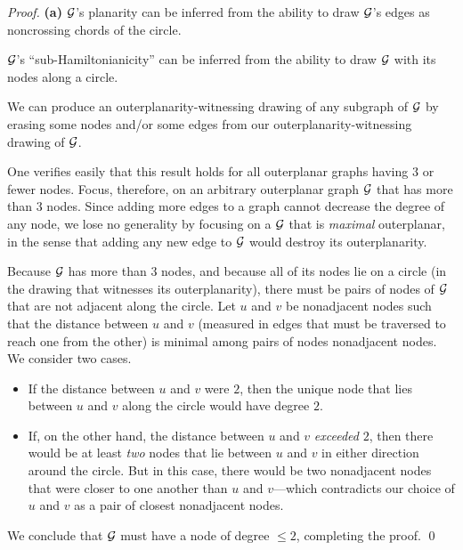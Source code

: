 \begin{proof}
{\bf (a)} $\mbox{$\cal G$}$'s planarity can be inferred from the ability to draw
$\mbox{$\cal G$}$'s edges as noncrossing chords of the circle.

\medskip

 $\mbox{$\cal G$}$'s ``sub-Hamiltonianicity'' can be inferred
from the ability to draw $\mbox{$\cal G$}$ with its nodes along a circle.

\medskip

 We can produce an outerplanarity-witnessing
drawing of any subgraph of $\mbox{$\cal G$}$ by erasing some nodes and/or some
edges from our outerplanarity-witnessing drawing of $\mbox{$\cal G$}$.

\medskip

 One verifies easily that this result holds for all
outerplanar graphs having $3$ or fewer nodes.  Focus, therefore, on an
arbitrary outerplanar graph $\mbox{$\cal G$}$ that has more than $3$ nodes.  Since
adding more edges to a graph cannot decrease the degree of any node,
we lose no generality by focusing on a $\mbox{$\cal G$}$ that is {\em maximal}
outerplanar,  in the sense that
adding any new edge to $\mbox{$\cal G$}$ would destroy its outerplanarity.

Because $\mbox{$\cal G$}$ has more than $3$ nodes, and because all of its nodes lie
on a circle (in the drawing that witnesses its outerplanarity), there
must be pairs of nodes of $\mbox{$\cal G$}$ that are not adjacent along the circle.
Let $u$ and $v$ be nonadjacent nodes such that the distance between
$u$ and $v$ (measured in edges that must be traversed to reach one
from the other) is minimal among pairs of nodes nonadjacent nodes.  We
consider two cases.
\begin{itemize}
\item
If the distance between $u$ and $v$ were $2$, then the unique node
that lies between $u$ and $v$ along the circle would have degree $2$.
\item
If, on the other hand, the distance between $u$ and $v$ {\em exceeded}
$2$, then there would be at least {\em two} nodes that lie between $u$
and $v$ in either direction around the circle.  But in this case,
there would be two nonadjacent nodes that were closer to one another
than $u$ and $v$---which contradicts our choice of $u$ and $v$ as a
pair of closest nonadjacent nodes.
\end{itemize}
We conclude that $\mbox{$\cal G$}$ must have a node of degree $\leq 2$, completing
the proof.
\qed
\end{proof}

